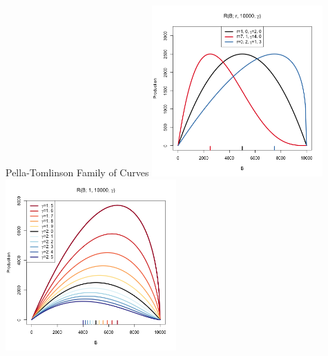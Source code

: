 \documentclass[ xcolor = pdftex, dvipsnames, table ]{beamer}
\begin{document}
%
\begin{frame}{Pella-Tomlinson Family of Curves}
\includegraphics[width=0.49\textwidth]{srr1.1.png}
\includegraphics[width=0.49\textwidth]{srr2.png}
\end{frame}
\end{document}
